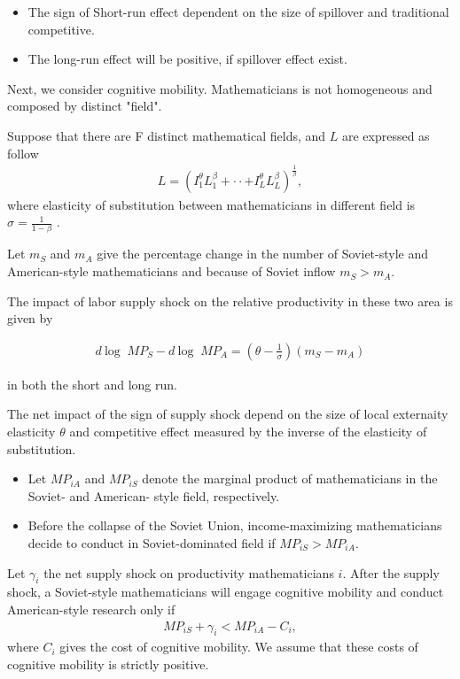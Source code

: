 \documentclass[../root]{subfiles}
\begin{document}
    \begin{itemize}
        \item  The sign of Short-run effect dependent on the size of spillover and traditional competitive.
        \item The long-run effect will be positive, if spillover effect exist.
    \end{itemize}
   
   Next, we consider cognitive mobility. Mathematicians is not homogeneous and composed by distinct "field".
   
   Suppose that there are F distinct mathematical fields, and $L$ are expressed as follow
   \begin{align}
       L = (I^{\theta}_1 L^{\beta}_1+ \cdot \cdot + I^{\theta}_L L^{\beta}_L)^{\frac{1}{\beta}},
   \end{align}
    where elasticity of substitution between mathematicians in different field is $\sigma = \frac{1}{1-\beta}$ .
    
    Let $m_S$ and $m_A$ give the percentage change in the number of  Soviet-style and American-style mathematicians and because of Soviet inflow $m_S > m_A$. 
    
    The impact of labor supply shock on the relative productivity  in these two area is given by
    
    \begin{align}
        d \ \mbox{log }\ MP_S - d \ \mbox{log }\ MP_A = (\theta-\frac{1}{\sigma})(m_S - m_A) 
    \end{align}
    
    in both the short and long run.
    
    The net impact of the sign of supply shock depend on the size of local externaity elasticity  $\theta$ and  competitive effect measured by the inverse of the elasticity of substitution. 
    
    \begin{itemize}
        \item Let $MP_{iA}$ and $MP_{iS}$ denote the marginal product of mathematicians in the Soviet- and American- style field, respectively.
        \item Before the collapse of the Soviet Union, income-maximizing mathematicians decide to conduct in Soviet-dominated field if $MP_{iS}>MP_{iA}$. 
    \end{itemize}
    
    Let $\gamma_i$ the net supply shock on productivity mathematicians $i$.
    After the supply shock, a Soviet-style mathematicians will engage cognitive mobility and conduct American-style research only if
    \begin{align}
        MP_{iS} + \gamma_i < MP_{iA}- C_i,
    \end{align} 
    where $C_i$ gives the cost of cognitive mobility. We assume that these costs of cognitive mobility is strictly positive.
    
\end{document}
